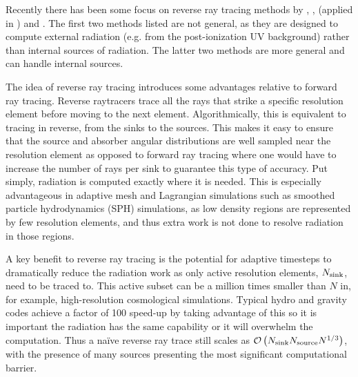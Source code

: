 \documentclass[fleq,usenatbib]{mnras}
\newcommand{\bigO}[1]{\mathcal{O}\left(#1\right)}
\newcommand{\NS}{N_{\rm source}}
\newcommand{\NK}{N_{\rm sink}}
\begin{document}
Recently there has been some focus on reverse ray tracing methods by
\cite{clarkEt12}, \cite{altayTheuns13}, \cite{Woods2015} (applied in \citealt{KannanEt14}) and \cite{HaidEt18}.
The first two methods listed are not 
general, as they are designed to compute external radiation (e.g. from the 
post-ionization UV background) rather than internal sources of radiation.
The latter two methods are more general and can handle internal sources.

The idea of reverse ray tracing introduces some advantages relative 
to forward ray tracing.  Reverse raytracers trace all the rays that strike
a specific resolution element before moving to the next element.
Algorithmically, this is equivalent to tracing in reverse, from the sinks to the sources.
This makes it easy to ensure that the source and absorber angular distributions
are well sampled near the resolution element as opposed to 
forward ray tracing where one would have to increase the number of rays per 
sink to guarantee this type of accuracy. Put simply, radiation is computed 
exactly where it is needed.  This is especially advantageous in adaptive mesh 
and Lagrangian simulations such as smoothed particle hydrodynamics (SPH) 
simulations, as low density regions are represented by few resolution 
elements, and thus extra work is not done to resolve radiation in those 
regions.

A key benefit to reverse ray tracing is the potential for adaptive timesteps to dramatically 
reduce the radiation work as only active resolution elements, $\NK$, need 
to be traced to. This active subset can be a million times smaller than 
$N$ in, for example, high-resolution cosmological simulations.
Typical hydro and gravity codes achieve a factor of 100 speed-up by taking advantage of this
so it is important the radiation has the same capability or it will overwhelm the computation.
Thus a na\"ive reverse 
ray trace still scales as $\bigO{\NK \NS N^{1/3}}$, with the presence of many 
sources presenting the most significant computational barrier.
\end{document}
